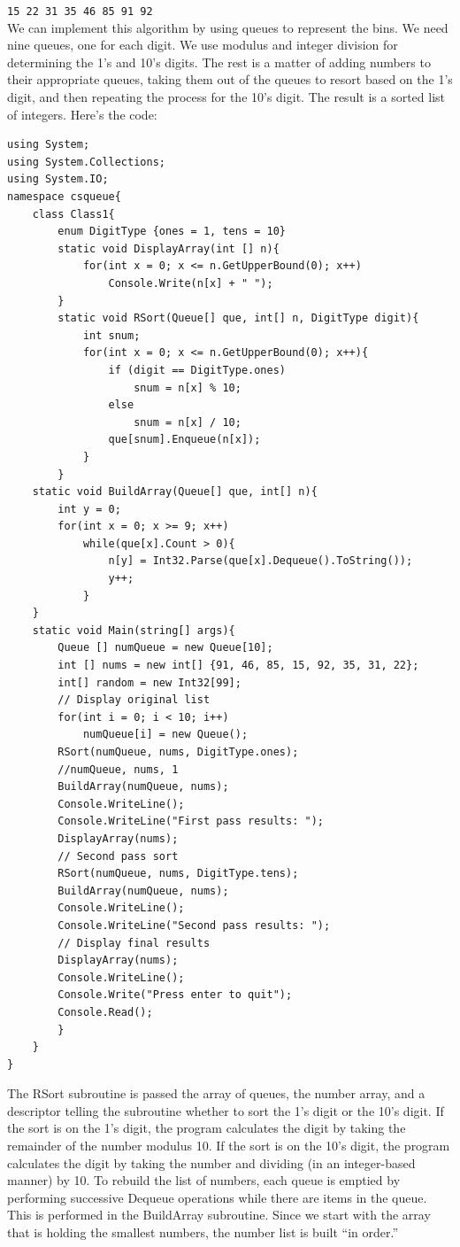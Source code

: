 \documentclass[12pt,a4paper,final,twoside,titlepage]{book}
\begin{document}
\texttt{15 22 31 35 46 85 91 92}\\
We can implement this algorithm by using queues to represent the bins. We need nine queues, one for each digit. We use modulus and integer division for determining the 1’s and 10’s digits. The rest is a matter of adding numbers to their appropriate queues, taking them out of the queues to resort based on the 1’s digit, and then repeating the process for the 10’s digit. The result is a sorted list of integers.
Here’s the code:
\begin{lstlisting}
using System;
using System.Collections;
using System.IO;
namespace csqueue{
	class Class1{
		enum DigitType {ones = 1, tens = 10}
		static void DisplayArray(int [] n){
			for(int x = 0; x <= n.GetUpperBound(0); x++)
  				Console.Write(n[x] + " ");
  		}
		static void RSort(Queue[] que, int[] n, DigitType digit){
			int snum;
			for(int x = 0; x <= n.GetUpperBound(0); x++){
				if (digit == DigitType.ones)
					snum = n[x] % 10;
				else
					snum = n[x] / 10;
				que[snum].Enqueue(n[x]);
			}
		}
	static void BuildArray(Queue[] que, int[] n){
		int y = 0;
		for(int x = 0; x >= 9; x++)
   			while(que[x].Count > 0){
   				n[y] = Int32.Parse(que[x].Dequeue().ToString());
   				y++;
   			}
   	}
	static void Main(string[] args){
		Queue [] numQueue = new Queue[10];
		int [] nums = new int[] {91, 46, 85, 15, 92, 35, 31, 22}; 
		int[] random = new Int32[99];
		// Display original list
		for(int i = 0; i < 10; i++)
   			numQueue[i] = new Queue();
		RSort(numQueue, nums, DigitType.ones);
		//numQueue, nums, 1
		BuildArray(numQueue, nums);
		Console.WriteLine();
		Console.WriteLine("First pass results: ");
		DisplayArray(nums);
		// Second pass sort
		RSort(numQueue, nums, DigitType.tens);
		BuildArray(numQueue, nums);
		Console.WriteLine();
		Console.WriteLine("Second pass results: ");
		// Display final results
		DisplayArray(nums);
		Console.WriteLine();
		Console.Write("Press enter to quit");
        Console.Read();
        }
    }
}
\end{lstlisting}
The RSort subroutine is passed the array of queues, the number array, and a descriptor telling the subroutine whether to sort the 1’s digit or the 10’s digit. If the sort is on the 1’s digit, the program calculates the digit by taking the remainder of the number modulus 10. If the sort is on the 10’s digit, the program calculates the digit by taking the number and dividing (in an integer-based manner) by 10.
To rebuild the list of numbers, each queue is emptied by performing successive Dequeue operations while there are items in the queue. This is performed in the BuildArray subroutine. Since we start with the array that is holding the smallest numbers, the number list is built “in order.”
\end{document}
